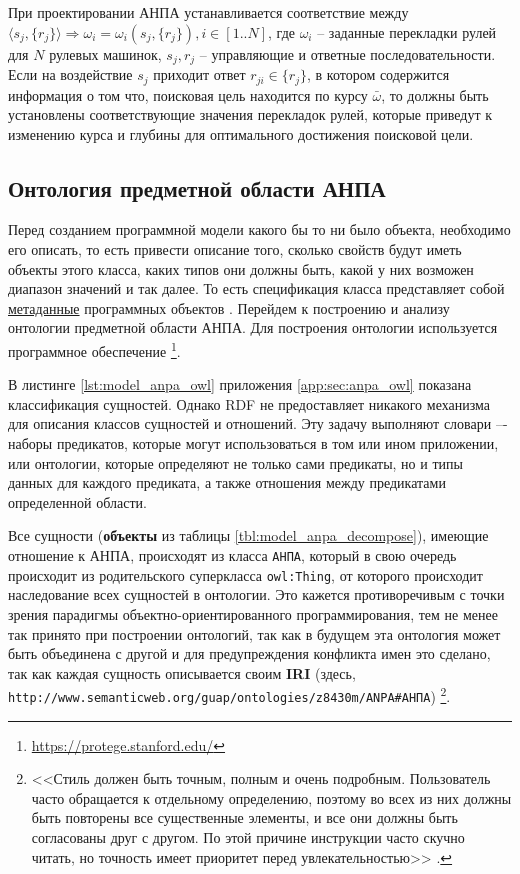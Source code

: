 При проектировании АНПА устанавливается соответствие между $\langle s_j, \{r_j\} \rangle \Rightarrow \omega_i = \omega_i(s_j, \{r_j\}), i\in [1..N]$,
где $\omega_i$ -- заданные перекладки рулей для $N$ рулевых машинок,
$s_j, r_j$ -- управляющие и ответные последовательности.
Если на воздействие $s_j$ приходит ответ $r_{ji} \in \{r_j\}$, в котором содержится информация о том что,
поисковая цель находится по курсу $\bar \omega$, то должны быть установлены соответствующие значения перекладок рулей,
которые приведут к изменению курса и глубины для оптимального достижения поисковой цели.



\subsection{Онтология предметной области АНПА}

Перед созданием программной модели какого бы то ни было объекта, необходимо его описать,
то есть привести описание того, сколько свойств будут иметь объекты этого класса,
каких типов они должны быть, какой у них возможен диапазон значений и так далее.
То есть спецификация класса представляет собой \underline{метаданные} программных объектов \cite{journal:vestnik_spbgu:ivakin}.
Перейдем к построению и анализу онтологии предметной области АНПА.
Для построения онтологии используется программное обеспечение
\protege\footnote{\url{https://protege.stanford.edu/}}.

В листинге \ref{lst:model_anpa_owl} приложения \ref{app:sec:anpa_owl} показана
классификация сущностей.
%
Однако RDF не предоставляет никакого механизма для описания классов сущностей и
отношений. Эту задачу выполняют словари –- наборы предикатов, которые могут
использоваться в том или ином приложении, или онтологии, которые определяют не только
сами предикаты, но и типы данных для каждого предиката, а также отношения между
предикатами определенной области.

Все сущности (\textbf{объекты} из таблицы \ref{tbl:model_anpa_decompose}), имеющие отношение к АНПА, происходят из класса \texttt{АНПА},
который в свою очередь происходит из родительского суперкласса \texttt{owl:Thing},
от которого происходит наследование всех сущностей в онтологии.
Это кажется противоречивым с точки зрения парадигмы объектно-ориентированного программирования,
тем не менее так принято при построении онтологий, так как в будущем эта онтология может быть объединена с другой
и для предупреждения конфликта имен это сделано, так как каждая сущность описывается своим \textbf{IRI}
(здесь, \texttt{http://www.semanticweb.org/guap/ontologies/z8430m/ANPA\#АНПА}) \cite[раздел 2.1]{journal:vestnik_vgtu:shapkin}\footnote{%
<<Стиль должен быть точным, полным и очень подробным. Пользователь часто обращается к отдельному определению,
    поэтому во всех из них должны быть повторены все существенные элементы, и все они должны быть согласованы друг с другом.
    По этой причине инструкции часто скучно читать, но точность имеет приоритет перед увлекательностью>> \cite[гл.~6]{book:bruks:myth_mount_man}.
}.

